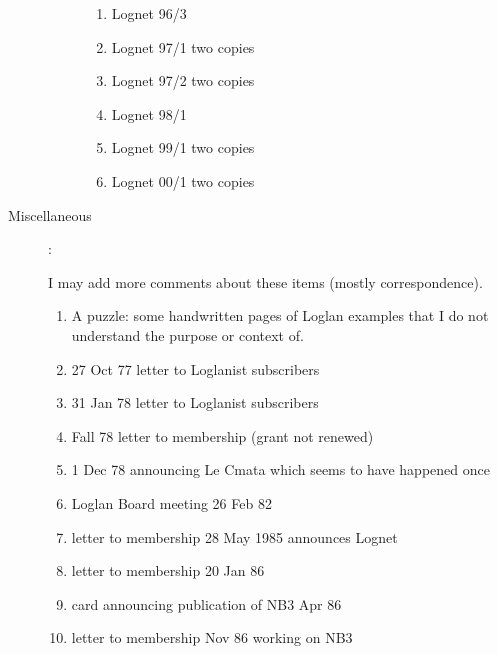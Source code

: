 \documentclass[12pt]{article}
\begin{document}
\begin{description}
\begin{description}
\begin{enumerate}
\item Lognet 96/3

\item Lognet 97/1 two copies

\item Lognet 97/2 two copies

\item Lognet 98/1

\item Lognet 99/1 two copies

\item Lognet 00/1 two copies












\end{enumerate}


\end{description}

\item[Miscellaneous]:

I may add more comments about these items (mostly correspondence).

\begin{enumerate}

\item  A puzzle:  some handwritten pages of Loglan examples that I do not understand the purpose or context of.

\item 27 Oct 77 letter to Loglanist subscribers

\item 31 Jan 78 letter to Loglanist subscribers

\item Fall 78 letter to membership (grant not renewed)

\item 1 Dec 78 announcing Le Cmata which seems to have happened once

\item Loglan Board meeting 26 Feb 82

\item letter to membership 28 May 1985 announces Lognet

\item letter to membership 20 Jan 86

\item card announcing publication of NB3 Apr 86

\item letter to membership Nov 86  working on NB3


\end{enumerate}
\end{description}
\end{document}
